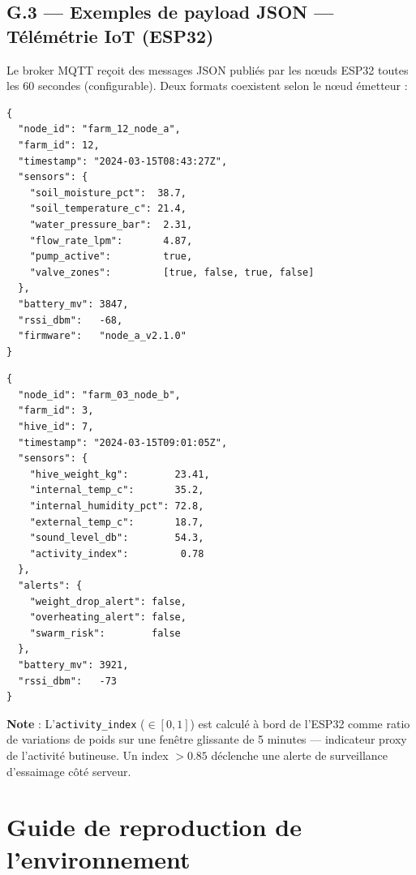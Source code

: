 \section*{G.3 — Exemples de payload JSON — Télémétrie IoT (ESP32)}

Le broker MQTT reçoit des messages JSON publiés par les nœuds ESP32 toutes les
60 secondes (configurable). Deux formats coexistent selon le nœud émetteur :

\begin{lstlisting}[caption={Payload JSON — Nœud A : contrôleur irrigation (ESP32-WROOM-32)},
  label={lst:json_node_a}]
{
  "node_id": "farm_12_node_a",
  "farm_id": 12,
  "timestamp": "2024-03-15T08:43:27Z",
  "sensors": {
    "soil_moisture_pct":  38.7,
    "soil_temperature_c": 21.4,
    "water_pressure_bar":  2.31,
    "flow_rate_lpm":       4.87,
    "pump_active":         true,
    "valve_zones":         [true, false, true, false]
  },
  "battery_mv": 3847,
  "rssi_dbm":   -68,
  "firmware":   "node_a_v2.1.0"
}
\end{lstlisting}

\begin{lstlisting}[caption={Payload JSON — Nœud B : monitoring ruche (ESP32-WROOM-32)},
  label={lst:json_node_b}]
{
  "node_id": "farm_03_node_b",
  "farm_id": 3,
  "hive_id": 7,
  "timestamp": "2024-03-15T09:01:05Z",
  "sensors": {
    "hive_weight_kg":        23.41,
    "internal_temp_c":       35.2,
    "internal_humidity_pct": 72.8,
    "external_temp_c":       18.7,
    "sound_level_db":        54.3,
    "activity_index":         0.78
  },
  "alerts": {
    "weight_drop_alert": false,
    "overheating_alert": false,
    "swarm_risk":        false
  },
  "battery_mv": 3921,
  "rssi_dbm":   -73
}
\end{lstlisting}

\textbf{Note} : L'\texttt{activity\_index} ($\in [0,1]$) est calculé à bord de l'ESP32
comme ratio de variations de poids sur une fenêtre glissante de 5 minutes — indicateur
proxy de l'activité butineuse. Un index $> 0.85$ déclenche une alerte de surveillance
d'essaimage côté serveur.

\chapter{Guide de reproduction de l'environnement}
\label{ann:reproduction}

